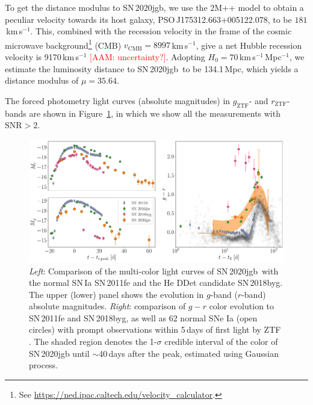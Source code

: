 \documentclass[twocolumn]{aastex631}
\newcommand{\sn}{SN\,2020jgb}
\newcommand{\adam}[1]{\textcolor{red}{[AAM: #1]}}
\begin{document}
To get the distance modulus to \sn, we use the 2M++ model \citep{Carrick2015_2M++} to obtain a peculiar velocity towards its host galaxy, PSO\,J175312.663+005122.078, to be $181$\,km\,s$^{-1}$. This, combined with the recession velocity in the frame of the cosmic microwave background\footnote{See \url{https://ned.ipac.caltech.edu/velocity_calculator}.} (CMB) $v_\mathrm{CMB}=8997$\,km\,s$^{-1}$, give a net Hubble recession velocity is 9170\,km\,s$^{-1}$ \adam{uncertainty?}. Adopting $H_0=70$\,km\,s$^{-1}$\,Mpc$^{-1}$, we estimate the luminosity distance to \sn\ to be 134.1\,Mpc, which yields a distance modulus of $\mu=35.64$.

The forced photometry light curves (absolute magnitudes) in $g_\mathrm{ZTF}$- and $r_\mathrm{ZTF}$-bands are shown in Figure~\ref{fig:photometry}, in which we show all the measurements with $\mathrm{SNR}>2$.

\begin{figure}
    \centering
    \includegraphics[width=\textwidth]{photometry.pdf}
    \caption{\textit{Left}: Comparison of the multi-color light curves  of \sn\ with the normal SN\,Ia SN\,2011fe and the He DDet candidate SN\,2018byg. The upper (lower) panel shows the evolution in $g$-band ($r$-band) absolute magnitudes. \textit{Right}: comparison of $g-r$ color evolution to SN\,2011fe and SN\,2018byg, as well as 62 normal SNe Ia (open circles) with prompt observations within 5\,days of first light by ZTF \citep{Bulla2020}. The shaded region denotes the 1-$\sigma$ credible interval of the color of SN\,2020jgb until $\sim$40\,days after the peak, estimated using Gaussian process.}
    \label{fig:photometry}
\end{figure}
\end{document}
